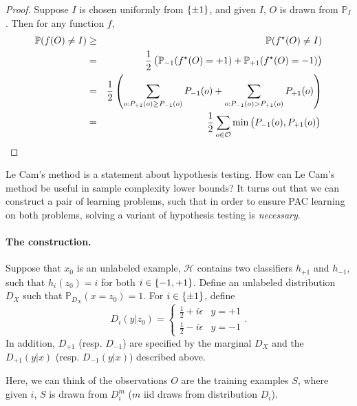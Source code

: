 \documentclass{article}
\newcommand{\PP}{\mathbb{P}}
\newcommand{\Hcal}{\mathcal{H}}
\newcommand{\Ocal}{\mathcal{O}}
\begin{document}
\begin{proof}
Suppose $I$ is chosen uniformly from $\cbr{\pm 1}$, and given $I$, $O$ is drawn from
$\PP_I$. Then for any function $f$,
\begin{eqnarray*}
  \PP(f(O) \neq I) &\geq& \PP(f^\star(O) \neq I) \\
   &=& \frac12 \del{\PP_{-1}(f^\star(O) = +1) + \PP_{+1}(f^\star(O) = -1)} \\
   &=& \frac12 \del{\sum_{o: P_{+1}(o) \geq P_{-1}(o)} P_{-1}(o) + \sum_{o: P_{-1}(o) > P_{+1}(o)} P_{+1}(o)} \\
   &=& \frac12 \sum_{o \in \Ocal} \min\del{P_{-1}(o), P_{+1}(o)}
   \qedhere
\end{eqnarray*}

\end{proof}

Le Cam's method is a statement about hypothesis testing.
How can Le Cam's method be useful in sample complexity lower bounds? It turns out
that we can construct a pair of learning problems, such that in order to ensure PAC
learning on both problems, solving a variant of hypothesis testing is {\em necessary}.

\paragraph{The construction.} Suppose that $x_0$ is an unlabeled example, $\Hcal$ contains two classifiers $h_{+1}$ and $h_{-1}$, such that $h_i(z_0) = i$ for both $i \in \cbr{-1,+1}$. Define an unlabeled distribution $D_X$ such that $\PP_{D_X}(x=z_0) = 1$. For $i \in \cbr{\pm 1}$, define
\[ D_i(y|z_0) = \begin{cases} \frac12 + i\epsilon & y = +1 \\ \frac12 - i\epsilon & y = -1 \end{cases}. \]
In addition, $D_{+1}$ (resp. $D_{-1}$) are specified by the marginal $D_X$ and the $D_{+1}(y|x)$ (resp. $D_{-1}(y|x)$) described above.

Here, we can think of the observations $O$ are the training examples $S$, where given $i$, $S$ is drawn from $D_i^m$ ($m$ iid draws from distribution $D_i$).
\end{document}
